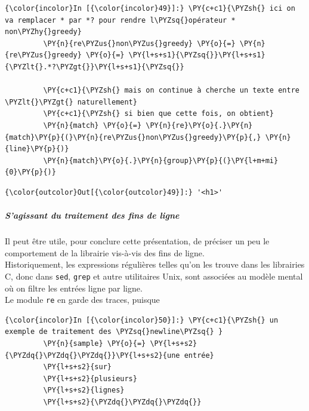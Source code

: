     \begin{Verbatim}[commandchars=\\\{\}]
{\color{incolor}In [{\color{incolor}49}]:} \PY{c+c1}{\PYZsh{} ici on va remplacer * par *? pour rendre l\PYZsq{}opérateur * non\PYZhy{}greedy}
         \PY{n}{re\PYZus{}non\PYZus{}greedy} \PY{o}{=} \PY{n}{re\PYZus{}greedy} \PY{o}{=} \PY{l+s+s1}{\PYZsq{}}\PY{l+s+s1}{\PYZlt{}.*?\PYZgt{}}\PY{l+s+s1}{\PYZsq{}}
         
         \PY{c+c1}{\PYZsh{} mais on continue à cherche un texte entre \PYZlt{}\PYZgt{} naturellement}
         \PY{c+c1}{\PYZsh{} si bien que cette fois, on obtient}
         \PY{n}{match} \PY{o}{=} \PY{n}{re}\PY{o}{.}\PY{n}{match}\PY{p}{(}\PY{n}{re\PYZus{}non\PYZus{}greedy}\PY{p}{,} \PY{n}{line}\PY{p}{)}
         \PY{n}{match}\PY{o}{.}\PY{n}{group}\PY{p}{(}\PY{l+m+mi}{0}\PY{p}{)}
\end{Verbatim}


\begin{Verbatim}[commandchars=\\\{\}]
{\color{outcolor}Out[{\color{outcolor}49}]:} '<h1>'
\end{Verbatim}
            
    \hypertarget{sagissant-du-traitement-des-fins-de-ligne}{%
\subparagraph{S'agissant du traitement des fins de
ligne}\label{sagissant-du-traitement-des-fins-de-ligne}}

    Il peut être utile, pour conclure cette présentation, de préciser un peu
le comportement de la librairie vis-à-vis des fins de ligne.\\

Historiquement, les expressions régulières telles qu'on les trouve dans
les librairies C, donc dans \texttt{sed}, \texttt{grep} et autre
utilitaires Unix, sont associées au modèle mental où on filtre les
entrées ligne par ligne.\\

Le module \texttt{re} en garde des traces, puisque

    \begin{Verbatim}[commandchars=\\\{\}]
{\color{incolor}In [{\color{incolor}50}]:} \PY{c+c1}{\PYZsh{} un exemple de traitement des \PYZsq{}newline\PYZsq{} }
         \PY{n}{sample} \PY{o}{=} \PY{l+s+s2}{\PYZdq{}\PYZdq{}\PYZdq{}}\PY{l+s+s2}{une entrée}
         \PY{l+s+s2}{sur}
         \PY{l+s+s2}{plusieurs}
         \PY{l+s+s2}{lignes}
         \PY{l+s+s2}{\PYZdq{}\PYZdq{}\PYZdq{}}
\end{Verbatim}



